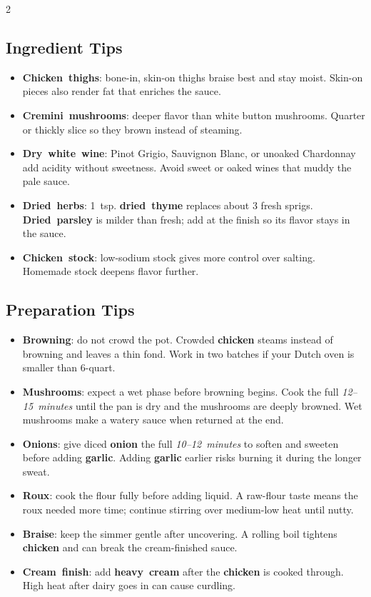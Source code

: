 \documentclass[11pt,letterpaper]{article}
\begin{document}
{\begin{multicols}{2}
\subsection*{Ingredient Tips}
\begin{itemize}
    \item \textbf{Chicken~thighs}: bone-in, skin-on thighs braise best and stay moist. Skin-on pieces also render fat that enriches the sauce.
    \item \textbf{Cremini~mushrooms}: deeper flavor than white button mushrooms. Quarter or thickly slice so they brown instead of steaming.
    \item \textbf{Dry~white~wine}: Pinot Grigio, Sauvignon Blanc, or unoaked Chardonnay add acidity without sweetness. Avoid sweet or oaked wines that muddy the pale sauce.
    \item \textbf{Dried~herbs}: 1~tsp. \textbf{dried~thyme} replaces about 3 fresh sprigs. \textbf{Dried~parsley} is milder than fresh; add at the finish so its flavor stays in the sauce.
    \item \textbf{Chicken~stock}: low-sodium stock gives more control over salting. Homemade stock deepens flavor further.
\end{itemize}

\subsection*{Preparation Tips}
\begin{itemize}
    \item \textbf{Browning}: do not crowd the pot. Crowded \textbf{chicken} steams instead of browning and leaves a thin fond. Work in two batches if your Dutch oven is smaller than 6-quart.
    \item \textbf{Mushrooms}: expect a wet phase before browning begins. Cook the full \textit{12--15~minutes} until the pan is dry and the mushrooms are deeply browned. Wet mushrooms make a watery sauce when returned at the end.
    \item \textbf{Onions}: give diced \textbf{onion} the full \textit{10--12~minutes} to soften and sweeten before adding \textbf{garlic}. Adding \textbf{garlic} earlier risks burning it during the longer sweat.
    \item \textbf{Roux}: cook the flour fully before adding liquid. A raw-flour taste means the roux needed more time; continue stirring over medium-low heat until nutty.
    \item \textbf{Braise}: keep the simmer gentle after uncovering. A rolling boil tightens \textbf{chicken} and can break the cream-finished sauce.
    \item \textbf{Cream~finish}: add \textbf{heavy~cream} after the \textbf{chicken} is cooked through. High heat after dairy goes in can cause curdling.
\end{itemize}


\end{multicols}}
\end{document}
